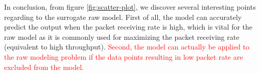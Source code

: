 


In conclusion, from figure \ref{fig:scatter-plot}, we discover several interesting points regarding to the surrogate \gls{raw} model. First of all, the model can accurately predict the output when the packet receiving rate is high, which is vital for the \gls{raw} model as it is commonly used for maximizing the packet receiving rate (equivalent to high throughput). \textcolor{red}{ Second, the model can actually be applied to the \gls{raw} modeling problem if the data points resulting in low packet rate are excluded from the model.}

 
